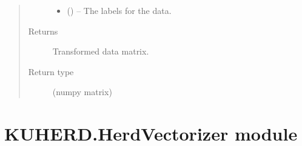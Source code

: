 \documentclass[letterpaper,10pt,english]{sphinxmanual}
\begin{document}
\begin{fulllineitems}
\begin{fulllineitems}
\begin{quote}
\begin{description}
\begin{itemize}
\item {} 
 () -- The labels for the data.

\end{itemize}

\item[{Returns}] \leavevmode
Transformed data matrix.

\item[{Return type}] \leavevmode
(numpy matrix)

\end{description}\end{quote}

\end{fulllineitems}


\end{fulllineitems}



\section{KUHERD.HerdVectorizer module}
\label{\detokenize{KUHERD:kuherd-herdvectorizer-module}}\label{\detokenize{KUHERD:module-KUHERD.HerdVectorizer}}
\end{document}
